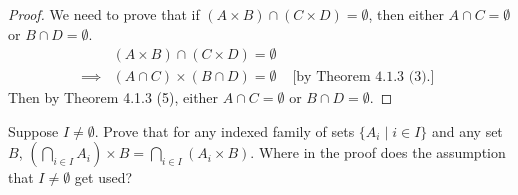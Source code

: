 \documentclass[12pt]{article}
\newenvironment{exercise}[2][Exercise]{\begin{trivlist}
\item[\hskip \labelsep {\bfseries #1}\hskip \labelsep {\bfseries #2.}]}{\end{trivlist}}
\begin{document}
\begin{proof}
	We need to prove that if \( (A\times B)\cap (C\times D)=\emptyset \), then either \( A\cap C=\emptyset \) or \( B\cap D=\emptyset \).
	\begin{align*}
		         & (A\times B)\cap (C\times D)=\emptyset &                                  \\
		\implies & (A\cap C)\times (B\cap D)=\emptyset   & \text{ [by Theorem 4.1.3 (3).] }
	\end{align*}
	Then by Theorem 4.1.3 (5), either \( A\cap C=\emptyset \) or \( B\cap D=\emptyset \).
\end{proof}

\begin{exercise}
	{13}
	Suppose \( I \neq \emptyset \). Prove that for any indexed family of sets \( \{A_i \mid i \in I \} \) and any set \( B \), \( \left( \bigcap_{i \in I} A_i \right) \times B = \bigcap_{i \in I} (A_i \times B) \). Where in the proof does the assumption that \( I \neq \emptyset \) get used?
\end{exercise}
\end{document}
